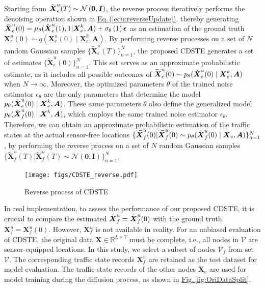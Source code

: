 \documentclass[a4paper,fleqn,12pt]{cas-sc}
\begin{document}
Starting from $\Tilde{\boldsymbol{X}}^{u}_{e}(T)\sim \mathcal{N}\left(\boldsymbol{0},\boldsymbol{I}\right)$, the reverse process iteratively performs the denoising operation shown in \hyperref[equ:reverseUpdate]{Eq.\,(\ref{equ:reverseUpdate})}, thereby generating $\Tilde{\boldsymbol{X}}^{u}_{e}(0)=\mu_\theta(\Tilde{\boldsymbol{X}}^{u}_{e}(1), 1 | \boldsymbol{X}^{k}_{e}, \boldsymbol{A}) + \sigma_\theta\left(1\right)\boldsymbol{\epsilon}$ as an estimation of the ground truth $\boldsymbol{X}^{u}_{e}(0)\sim q(\boldsymbol{X}^{u}_{e}(0) \mid \boldsymbol{X}^{k}_{e}, \boldsymbol{A})$. By performing reverse processes on a set of $N$ random Gaussian samples $\{\widetilde{\boldsymbol{X}}^{u}_{e}(T)\}_{n=1}^{N}$, the proposed CDSTE generates a set of estimates $\{\widetilde{\boldsymbol{X}}^{u}_{e}(0)\}_{n=1}^{N}$. This set serves as an approximate probabilistic estimate, as it includes all possible outcomes of $\widetilde{\boldsymbol{X}}^{u}_{e}(0)\sim p_{\theta}(\Tilde{\boldsymbol{X}}^{u}_{e}(0)\mid \boldsymbol{X}^{k}_{e}, \boldsymbol{A})$ when $N\rightarrow \infty$. Moreover, the optimized parameters $\theta$ of the trained noise estimator $\epsilon_{\theta}$ are the only parameters that determine the model $p_{\theta}(\Tilde{\boldsymbol{X}}^{u}_{e}(0)\mid \boldsymbol{X}^{k}_{e}, \boldsymbol{A})$.  These same parameters $\theta$ also define the generalized model $p_{\theta}(\Tilde{\boldsymbol{X}}^{u}_{f}(0)\mid \boldsymbol{X}^{k}, \boldsymbol{A})$, which employs the same trained noise estimator $\epsilon_{\theta}$. Therefore, we can obtain an approximate probabilistic estimation of the traffic states at the actual sensor-free locations $\{\widetilde{\boldsymbol{X}}^{u}_{f}(0) | \widetilde{\boldsymbol{X}}^{u}_{f}(0)\sim p_{\theta}(\Tilde{\boldsymbol{X}}^{u}_{f}(0)\mid \boldsymbol{X}_{e}, \boldsymbol{A})\}_{n=1}^{N}$, by performing the reverse process on a set of $N$ random Gaussian samples $\{\widetilde{\boldsymbol{X}}^{u}_{f}(T) | \widetilde{\boldsymbol{X}}^{u}_{f}(T)\sim \mathcal{N}(\boldsymbol{0},\boldsymbol{I})\}_{n=1}^{N}$. 

\begin{figure}[pos=htbp,width=7.5cm,align=\centering]
  \centering 
  \texttt{[image: figs/CDSTE\_reverse.pdf]}
  \caption{Reverse process of CDSTE}\label{fig:CDSTE_reverse}
\end{figure}


In real implementation, to assess the performance of our proposed CDSTE, it is crucial to compare the estimated $\Tilde{\boldsymbol{X}}^{u}_{f} = \Tilde{\boldsymbol{X}}^{u}_{f}(0)$ with the ground truth $\boldsymbol{X}^{u}_{f} = \boldsymbol{X}^{u}_{f}(0)$. However, $\boldsymbol{X}^{u}_{f}$ is not available in reality. For an unbiased evaluation of CDSTE, the original data $\boldsymbol{X}\in\mathbb{R}^{L\times V}$ must be complete, i.e., all nodes in $\boldsymbol{\mathcal{V}}$ are sensor-equipped locations. In this study, we select a subset of nodes $\boldsymbol{\mathcal{V}}_{f}$ from set $\boldsymbol{\mathcal{V}}$. The corresponding traffic state records $\boldsymbol{X}^{u}_{f}$ are retained as the test dataset for model evaluation. The traffic state records of the other nodes $\boldsymbol{X}_{e}$ are used for model training during the diffusion process, as shown in \hyperref[fig:OriDataSplit]{Fig.\,\ref{fig:OriDataSplit}}.
\end{document}
